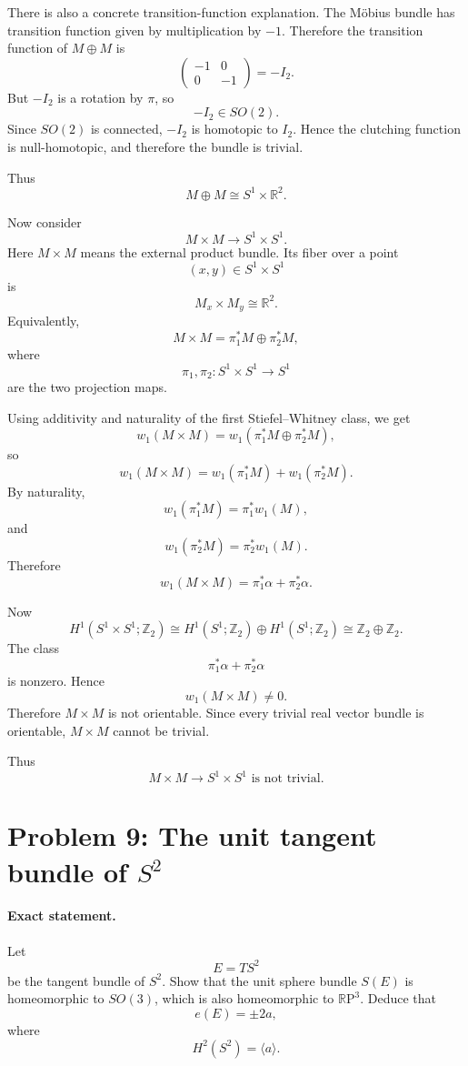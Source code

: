 \documentclass[12pt,a4paper]{article}
\newcommand{\RP}{\mathbb{R}\mathrm{P}}
\theoremstyle{notespace}
\begin{document}
	There is also a concrete transition-function explanation. The M\"obius bundle has transition function given by multiplication by \(-1\). Therefore the transition function of \(M\oplus M\) is
	\[
	\begin{pmatrix}
		-1&0\\
		0&-1
	\end{pmatrix}
	=
	-I_{2}.
	\]
	But \(-I_{2}\) is a rotation by \(\pi\), so
	\[
	-I_{2}\in SO(2).
	\]
	Since \(SO(2)\) is connected, \(-I_{2}\) is homotopic to \(I_{2}\). Hence the clutching function is null-homotopic, and therefore the bundle is trivial.
	
	Thus
	\[
	\boxed{M\oplus M\cong S^{1}\times \mathbb R^{2}.}
	\]
	
	Now consider
	\[
	M\times M\to S^{1}\times S^{1}.
	\]
	Here \(M\times M\) means the external product bundle. Its fiber over a point
	\[
	(x,y)\in S^{1}\times S^{1}
	\]
	is
	\[
	M_{x}\times M_{y}\cong \mathbb R^{2}.
	\]
	Equivalently,
	\[
	M\times M
	=
	\pi_{1}^{*}M\oplus \pi_{2}^{*}M,
	\]
	where
	\[
	\pi_{1},\pi_{2}:S^{1}\times S^{1}\to S^{1}
	\]
	are the two projection maps.
	
	Using additivity and naturality of the first Stiefel--Whitney class, we get
	\[
	w_{1}(M\times M)
	=
	w_{1}(\pi_{1}^{*}M\oplus \pi_{2}^{*}M),
	\]
	so
	\[
	w_{1}(M\times M)
	=
	w_{1}(\pi_{1}^{*}M)+w_{1}(\pi_{2}^{*}M).
	\]
	By naturality,
	\[
	w_{1}(\pi_{1}^{*}M)=\pi_{1}^{*}w_{1}(M),
	\]
	and
	\[
	w_{1}(\pi_{2}^{*}M)=\pi_{2}^{*}w_{1}(M).
	\]
	Therefore
	\[
	w_{1}(M\times M)
	=
	\pi_{1}^{*}\alpha+\pi_{2}^{*}\alpha.
	\]
	
	Now
	\[
	H^{1}(S^{1}\times S^{1};\mathbb Z_{2})
	\cong
	H^{1}(S^{1};\mathbb Z_{2})\oplus H^{1}(S^{1};\mathbb Z_{2})
	\cong
	\mathbb Z_{2}\oplus \mathbb Z_{2}.
	\]
	The class
	\[
	\pi_{1}^{*}\alpha+\pi_{2}^{*}\alpha
	\]
	is nonzero. Hence
	\[
	w_{1}(M\times M)\neq 0.
	\]
	Therefore \(M\times M\) is not orientable. Since every trivial real vector bundle is orientable, \(M\times M\) cannot be trivial.
	
	Thus
	\[
	\boxed{M\times M\to S^{1}\times S^{1}\text{ is not trivial}.}
	\]
	
	\section{Problem 9: The unit tangent bundle of \(S^{2}\)}
	
	\paragraph{Exact statement.}
	Let
	\[
	E=TS^{2}
	\]
	be the tangent bundle of \(S^{2}\). Show that the unit sphere bundle \(S(E)\) is homeomorphic to \(SO(3)\), which is also homeomorphic to \(\RP^{3}\). Deduce that
	\[
	e(E)=\pm 2a,
	\]
	where
	\[
	H^{2}(S^{2})=\langle a\rangle.
	\]
	
\end{document}
